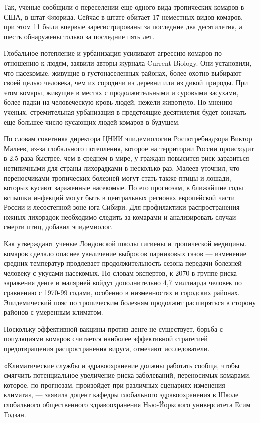 Так, ученые сообщили о переселении еще одного вида тропических комаров в США, в штат Флорида. Сейчас в штате обитает 17 неместных видов комаров, при этом 11 были впервые зарегистрированы за последние два десятилетия, а шесть обнаружены только за последние пять лет.

Глобальное потепление и урбанизация усиливают агрессию комаров по отношению к людям, заявили авторы журнала Current Biology. Они установили, что насекомые, живущие в густонаселенных районах, более охотно выбирают своей целью человека, чем их сородичи из деревни или из дикой природы. При этом комары, живущие в местах с продолжительными и суровыми засухами, более падки на человеческую кровь людей, нежели животную. По мнению ученых, стремительная урбанизация в предстоящие десятилетия будет означать еще большее число кусающих людей комаров в будущем.

По словам советника директора ЦНИИ эпидемиологии Роспотребнадзора Виктор Малеев, из-за глобального потепления, которое на территории России происходит в 2,5 раза быстрее, чем в среднем в мире, у граждан повысится риск заразиться нетипичными для страны лихорадками в несколько раз. Малеев уточнил, что переносчиками тропических болезней могут стать также птицы и лошади, которых кусают зараженные насекомые. По его прогнозам, в ближайшие годы вспышки инфекций могут быть в центральных регионах европейской части России и лесостепной зоне юга Сибири. Для профилактики распространения южных лихорадок необходимо следить за комарами и анализировать случаи смерти птиц, добавил эпидемиолог.

Как утверждают ученые Лондонской школы гигиены и тропической медицины. комаров сделало опаснее увеличение выбросов парниковых газов — изменение средних температур продлевает продолжительность сезона передачи болезней человеку с укусами насекомых. По словам экспертов, к 2070 в группе риска заражения денге и малярией войдут дополнительно 4,7 миллиарда человек по сравнению с 1970-99 годами, особенно в низменностях и городских районах. Эпидемический пояс по тропическим болезням продолжит расширяться в сторону районов с умеренным климатом.

Поскольку эффективной вакцины против денге не существует, борьба с популяциями комаров считается наиболее эффективной стратегией предотвращения распространения вируса, отмечают исследователи.

«Климатические службы и здравоохранение должны работать сообща, чтобы смягчить потенциальное увеличение риска заболеваний, переносимых комарами, которое, по прогнозам, произойдет при различных сценариях изменения климата», — заявила доцент кафедры глобального здравоохранения в Школе глобального общественного здравоохранения Нью-Йоркского университета Есим Тодзан.


